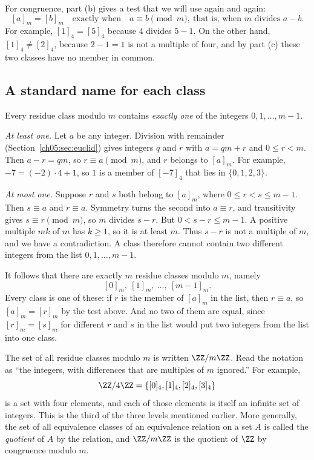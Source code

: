 For congruence, part (b) gives a test that we will use again and again:
\[
[a]_m=[b]_m\quad\text{exactly when}\quad a\equiv b\pmod m,\ \text{that is, when $m$ divides $a-b$.}
\]
For example, $[1]_4=[5]_4$ because $4$ divides $5-1$. On the other hand, $[1]_4\ne[2]_4$, because $2-1=1$ is not a multiple of four, and by part (c) these two classes have no member in common.

\subsection*{A standard name for each class}
Every residue class modulo $m$ contains \emph{exactly one} of the integers $0,1,\ldots,m-1$.

\emph{At least one.} Let $a$ be any integer. Division with remainder (Section~\ref{ch05:sec:euclid}) gives integers $q$ and $r$ with $a=qm+r$ and $0\le r<m$. Then $a-r=qm$, so $r\equiv a\pmod m$, and $r$ belongs to $[a]_m$. For example, $-7=(-2)\cdot4+1$, so $1$ is a member of $[-7]_4$ that lies in $\{0,1,2,3\}$.

\emph{At most one.} Suppose $r$ and $s$ both belong to $[a]_m$, where $0\le r<s\le m-1$. Then $s\equiv a$ and $r\equiv a$. Symmetry turns the second into $a\equiv r$, and transitivity gives $s\equiv r\pmod m$, so $m$ divides $s-r$. But $0<s-r\le m-1$. A positive multiple $mk$ of $m$ has $k\ge1$, so it is at least $m$. Thus $s-r$ is not a multiple of $m$, and we have a contradiction. A class therefore cannot contain two different integers from the list $0,1,\ldots,m-1$.

It follows that there are exactly $m$ residue classes modulo $m$, namely
\[
[0]_m,\ [1]_m,\ \ldots,\ [m-1]_m.
\]
Every class is one of these: if $r$ is the member of $[a]_m$ in the list, then $r\equiv a$, so $[a]_m=[r]_m$ by the test above. And no two of them are equal, since $[r]_m=[s]_m$ for different $r$ and $s$ in the list would put two integers from the list into one class.

The set of all residue classes modulo $m$ is written $\ZZ/m\ZZ$. Read the notation as ``the integers, with differences that are multiples of $m$ ignored.'' For example,
\[
\ZZ/4\ZZ=\{[0]_4,[1]_4,[2]_4,[3]_4\}
\]
is a set with four elements, and each of those elements is itself an infinite set of integers. This is the third of the three levels mentioned earlier. More generally, the set of all equivalence classes of an equivalence relation on a set $A$ is called the \emph{quotient} of $A$ by the relation, and $\ZZ/m\ZZ$ is the quotient of $\ZZ$ by congruence modulo $m$.

